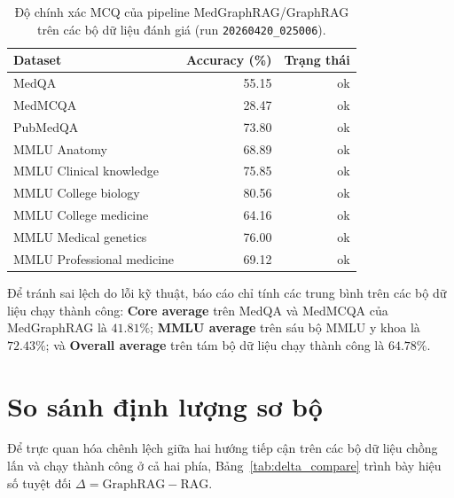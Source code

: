 \documentclass[a4paper,12pt,twoside]{report}
\begin{document}
\begin{table}[H]
  \centering
  \caption{Độ chính xác MCQ của pipeline MedGraphRAG/GraphRAG trên các bộ dữ liệu đánh giá (run \texttt{20260420\_025006}).}
  \label{tab:results_graphrag}
  \begin{tabular}{@{}lrr@{}}
    \toprule
    \textbf{Dataset} & \textbf{Accuracy (\%)} & \textbf{Trạng thái} \\
    \midrule
    MedQA & 55.15 & ok \\
    MedMCQA & 28.47 & ok \\
    PubMedQA & 73.80 &  ok \\
    MMLU Anatomy & 68.89 & ok \\
    MMLU Clinical knowledge & 75.85 & ok \\
    MMLU College biology & 80.56 & ok \\
    MMLU College medicine & 64.16 & ok \\
    MMLU Medical genetics & 76.00 & ok \\
    MMLU Professional medicine & 69.12 & ok \\
    \bottomrule
  \end{tabular}
\end{table}

Để tránh sai lệch do lỗi kỹ thuật, báo cáo chỉ tính các trung bình trên các bộ dữ liệu chạy thành công: \textbf{Core average} trên MedQA và MedMCQA của MedGraphRAG là \(41.81\%\); \textbf{MMLU average} trên sáu bộ MMLU y khoa là \(72.43\%\); và \textbf{Overall average} trên tám bộ dữ liệu chạy thành công là \(64.78\%\).

\section{So sánh định lượng sơ bộ}
Để trực quan hóa chênh lệch giữa hai hướng tiếp cận trên các bộ dữ liệu chồng lấn và chạy thành công ở cả hai phía, Bảng~\ref{tab:delta_compare} trình bày hiệu số tuyệt đối \(\Delta = \text{GraphRAG} - \text{RAG}\).
\end{document}
